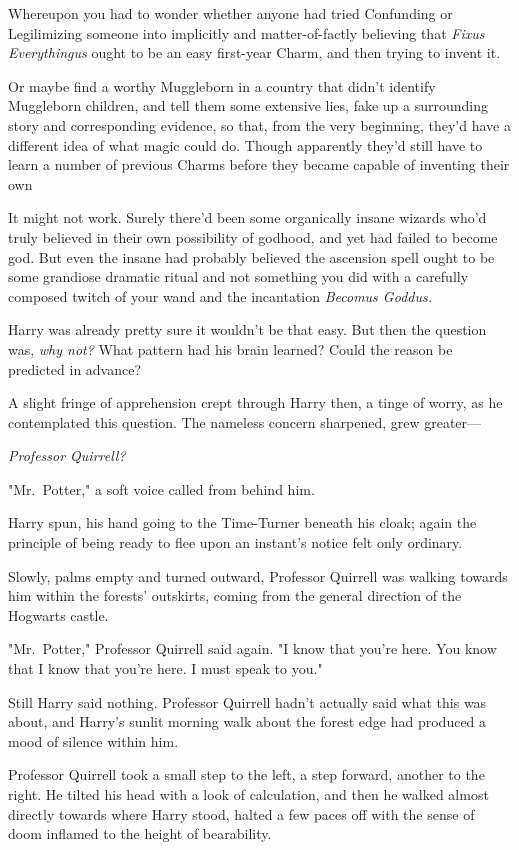Whereupon you had to wonder whether anyone had tried Confunding or Legilimizing
someone into implicitly and matter-of-factly believing that \emph{Fixus
Everythingus} ought to be an easy first-year Charm, and then trying to invent
it.

Or maybe find a worthy Muggleborn in a country that didn't identify Muggleborn
children, and tell them some extensive lies, fake up a surrounding story and
corresponding evidence, so that, from the very beginning, they'd have a
different idea of what magic could do. Though apparently they'd still have to
learn a number of previous Charms before they became capable of inventing their
own{\el}

It might not work. Surely there'd been some organically insane wizards who'd
truly believed in their own possibility of godhood, and yet had failed to
become god. But even the insane had probably believed the ascension spell ought
to be some grandiose dramatic ritual and not something you did with a carefully
composed twitch of your wand and the incantation \emph{Becomus Goddus.}

Harry was already pretty sure it wouldn't be that easy. But then the question
was, \emph{why not?} What pattern had his brain learned? Could the reason be
predicted in advance?

A slight fringe of apprehension crept through Harry then, a tinge of worry, as
he contemplated this question. The nameless concern sharpened, grew greater---

\emph{Professor Quirrell?}

"Mr.~Potter," a soft voice called from behind him.

Harry spun, his hand going to the Time-Turner beneath his cloak; again the
principle of being ready to flee upon an instant's notice felt only ordinary.

Slowly, palms empty and turned outward, Professor Quirrell was walking towards
him within the forests' outskirts, coming from the general direction of the
Hogwarts castle.

"Mr.~Potter," Professor Quirrell said again. "I know that you're here. You know
that I know that you're here. I must speak to you."

Still Harry said nothing. Professor Quirrell hadn't actually said what this was
about, and Harry's sunlit morning walk about the forest edge had produced a
mood of silence within him.

Professor Quirrell took a small step to the left, a step forward, another to
the right. He tilted his head with a look of calculation, and then he walked
almost directly towards where Harry stood, halted a few paces off with the
sense of doom inflamed to the height of bearability.

